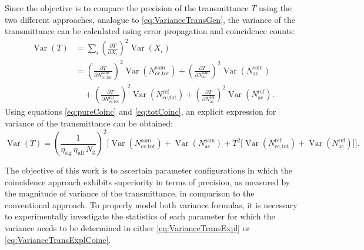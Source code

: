 Since the objective is to compare the precision of the transmittance $T$ using the two different approaches, analogue to \autoref{eq:VarianceTransGen}, the variance of the transmittance can be calculated using error propagation and coincidence counts:
\begin{equation}
	\begin{aligned}
		\operatorname{Var}(T) 
		&= \sum_{i} \left( \frac{\partial T}{\partial X_i} \right)^{2} 
		\operatorname{Var}\!\left(X_i\right) \\[0.5em]
		&= \left( \frac{\partial T}{\partial N_{\text{cc,tot}}^{\text{sam}}} \right)^{2} 
		\operatorname{Var}\!\left(N_{\text{cc,tot}}^{\text{sam}}\right)
		+ \left( \frac{\partial T}{\partial N_{\text{ac}}^{\text{sam}}} \right)^{2} 
		\operatorname{Var}\!\left(N_{\text{ac}}^{\text{sam}}\right) \\[0.5em]
		&\quad + \left( \frac{\partial T}{\partial N_{\text{cc,tot}}^{\text{ref}}} \right)^{2} 
		\operatorname{Var}\!\left(N_{\text{cc,tot}}^{\text{ref}}\right)
		+ \left( \frac{\partial T}{\partial N_{\text{ac}}^{\text{ref}}} \right)^{2} 
		\operatorname{Var}\!\left(N_{\text{ac}}^{\text{ref}}\right).
	\end{aligned}
	\label{eq:VarianceTransGenCoinc}
\end{equation}
Using equations \ref{eq:pureCoinc} and \ref{eq:totCoinc}, an explicit expression for variance of the transmittance can be obtained:
 \begin{equation}
 	\operatorname{Var}(T) 
 	= \left( \frac{1}{\eta_{\text{sig}}\,\eta_{\text{idl}}\,N_{\mathrm{g}}} \right)^{2}
 	\Bigg[
 	\operatorname{Var}\!\left(N_{\text{cc,tot}}^{\text{sam}}\right) 
 	+ \operatorname{Var}\!\left(N_{\text{ac}}^{\text{sam}}\right) 
 	+ T^{2} \Big[ 
 	\operatorname{Var}\!\left(N_{\text{cc,tot}}^{\text{ref}}\right) 
 	+ \operatorname{Var}\!\left(N_{\text{ac}}^{\text{ref}}\right) 
 	\Big]
 	\Bigg].
 	\label{eq:VarianceTransExplCoinc}
 \end{equation}
 
The objective of this work is to ascertain parameter configurations in which the coincidence approach exhibits superiority in terms of precision, as measured by the magnitude of variance of the transmittance, in comparison to the conventional approach. To properly model both variance formulas, it is necessary to experimentally investigate the statistics of each parameter for which the variance needs to be determined in either \autoref{eq:VarianceTransExpl} or \autoref{eq:VarianceTransExplCoinc}.
